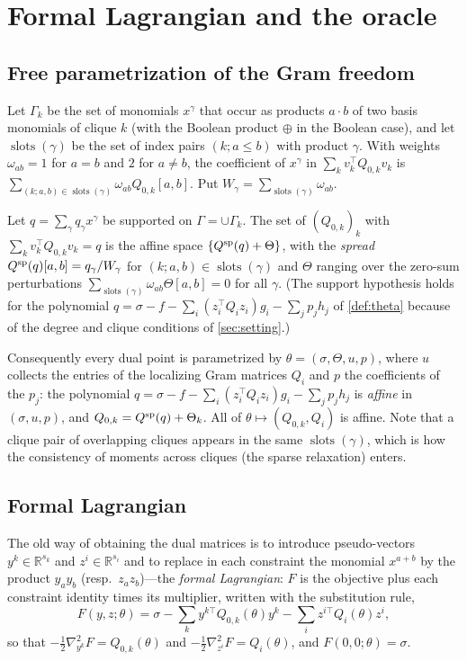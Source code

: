 \documentclass[a4paper,11pt]{article}
\theoremstyle{plain}
\theoremstyle{definition}
\theoremstyle{remark}
\newcommand{\R}{\mathbb{R}}
\begin{document}
\section{Formal Lagrangian and the oracle}\label{sec:formal}
\subsection{Free parametrization of the Gram freedom}
Let $\Gamma_k$ be the set of monomials $x^\gamma$ that occur as products $a\cdot b$ of two basis monomials of clique $k$ (with the Boolean product $\oplus$ in the Boolean case), and let $\operatorname{slots}(\gamma)$ be the set of index pairs $(k;a\le b)$ with product $\gamma$. With weights $\omega_{ab}=1$ for $a=b$ and $2$ for $a\ne b$, the coefficient of $x^\gamma$ in $\sum_kv_k^\top Q_{0,k}v_k$ is $\sum_{(k;a,b)\in\operatorname{slots}(\gamma)}\omega_{ab}Q_{0,k}[a,b]$. Put $W_\gamma=\sum_{\operatorname{slots}(\gamma)}\omega_{ab}$.

\begin{lemma}\label{lem:gram}
Let $q=\sum_\gamma q_\gamma x^\gamma$ be supported on $\Gamma=\cup\Gamma_k$. The set of $(Q_{0,k})_k$ with $\sum_kv_k^\top Q_{0,k}v_k=q$ is the affine space $\{Q^{\rm sp}(q)+\Theta\}$, with the \emph{spread} $Q^{\rm sp}(q)[a,b]=q_\gamma/W_\gamma$ for $(k;a,b)\in\operatorname{slots}(\gamma)$ and $\Theta$ ranging over the zero-sum perturbations $\sum_{\operatorname{slots}(\gamma)}\omega_{ab}\Theta[a,b]=0$ for all $\gamma$. (The support hypothesis holds for the polynomial $q=\sigma-f-\sum_i(z_i^\top Q_iz_i)g_i-\sum_jp_jh_j$ of \cref{def:theta} because of the degree and clique conditions of \cref{sec:setting}.)
\end{lemma}
\noindent Consequently every dual point is parametrized by $\theta=(\sigma,\Theta,u,p)$, where $u$ collects the entries of the localizing Gram matrices $Q_i$ and $p$ the coefficients of the $p_j$: the polynomial $q=\sigma-f-\sum_i(z_i^\top Q_iz_i)g_i-\sum_jp_jh_j$ is \emph{affine} in $(\sigma,u,p)$, and $Q_{0,k}=Q^{\rm sp}(q)+\Theta_k$. All of $\theta\mapsto(Q_{0,k},Q_i)$ is affine. Note that a clique pair of overlapping cliques appears in the same $\operatorname{slots}(\gamma)$, which is how the consistency of moments across cliques (the sparse relaxation) enters.

\subsection{Formal Lagrangian}
The old way of obtaining the dual matrices is to introduce pseudo-vectors $y^k\in\R^{s_k}$ and $z^i\in\R^{s_i}$ and to replace in each constraint the monomial $x^{a+b}$ by the product $y_ay_b$ (resp.\ $z_az_b$)---the \emph{formal Lagrangian}: $F$ is the objective plus each constraint identity times its multiplier, written with the substitution rule,
\[
F(y,z;\theta)=\sigma-\sum_k y^{k\top}Q_{0,k}(\theta)y^k-\sum_iz^{i\top}Q_i(\theta)z^i,
\]
so that $-\tfrac12\nabla^2_{y^k}F=Q_{0,k}(\theta)$ and $-\tfrac12\nabla^2_{z^i}F=Q_i(\theta)$, and $F(0,0;\theta)=\sigma$.
\end{document}
